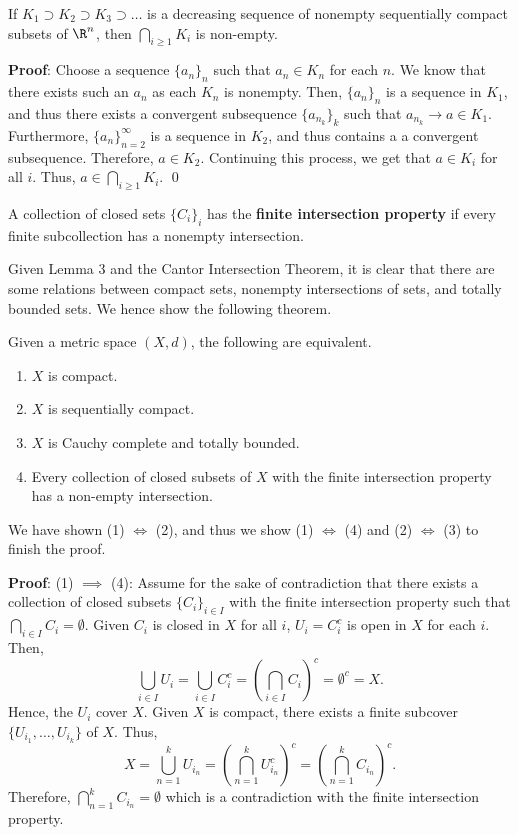 \begin{theorem}
If $K_1 \supset K_2\supset K_3\supset \dots$ is a decreasing sequence of nonempty sequentially compact subsets of $\R^n$, then $\bigcap_{i\geq 1}K_i$ is non-empty.
\end{theorem}
\textbf{Proof}: Choose a sequence $\{a_n\}_n$ such that $a_n \in K_n$ for each $n$. We know that there exists such an $a_n$ as each $K_n$ is nonempty. Then, $\{a_n\}_n$ is a sequence in $K_1$, and thus there exists a convergent subsequence $\{a_{n_k}\}_k$ such that $a_{n_k}\to a\in K_1$. Furthermore, $\{a_n\}_{n=2}^\infty$ is a sequence in $K_2$, and thus contains a a convergent subsequence. Therefore, $a\in K_2$. Continuing this process, we get that $a\in K_i$ for all $i$. Thus, $a\in \bigcap_{i\geq 1} K_i$. \qed 

\begin{definition}
A collection of closed sets $\{C_i\}_i$ has the \textbf{finite intersection property} if every finite subcollection has a nonempty intersection.
\end{definition}

Given Lemma 3 and the Cantor Intersection Theorem, it is clear that there are some relations between compact sets, nonempty intersections of sets, and totally bounded sets. We hence show the following theorem.

\begin{theorem}
Given a metric space $(X,d)$, the following are equivalent. 
\begin{enumerate}[label = (\arabic*)]
    \item $X$ is compact.
    \item $X$ is sequentially compact.
    \item $X$ is Cauchy complete and totally bounded.
    \item Every collection of closed subsets of $X$ with the finite intersection property has a non-empty intersection.
\end{enumerate}
\end{theorem}
We have shown (1) $\iff$ (2), and thus we show  (1) $\iff$ (4) and (2) $\iff$ (3) to finish the proof.

\textbf{Proof}: (1) $\implies$ (4): Assume for the sake of contradiction that there exists a collection of closed subsets $\{C_i\}_{i\in I}$ with the finite intersection property such that $\bigcap_{i\in I} C_i = \emptyset$. Given $C_i$ is closed in $X$ for all $i$, $U_i = C_i^c$ is open in $X$ for each $i.$ Then,
\[
\bigcup_{i\in I} U_i = \bigcup_{i\in I} C_i^c = \left(\bigcap_{i\in I} C_i\right)^c = \emptyset^c = X.
\]
Hence, the $U_i$ cover $X$. Given $X$ is compact, there exists a finite subcover $\{U_{i_1}, \dots, U_{i_k}\}$ of $X.$ Thus, 
\[
    X = \bigcup_{n=1}^k U_{i_n} = \left(\bigcap_{n=1}^k U_{i_n}^c\right)^c = \left(\bigcap_{n=1}^k C_{i_n}\right)^c.
\]
Therefore, $\bigcap_{n=1}^k C_{i_n}= \emptyset$ which is a contradiction with the finite intersection property.

